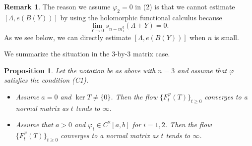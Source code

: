 \documentclass[12pt]{article}
\newtheorem{proposition}[theorem]{Proposition}
\theoremstyle{definition}
\newtheorem{remark}[theorem]{Remark}
\numberwithin{equation}{section}
\begin{document}
\begin{remark} The reason we assume $\varphi_2=0$ in (2) is that we cannot estimate $[\Lambda, e(B(Y))]$ 
by using the holomorphic functional calculus because 
\[\lim_{Y\to 0}s_{n-m^g_1}(\Lambda+Y)=0.\]
As we see below, we can directly estimate $[\Lambda, e(B(Y))]$ when $n$ is small. 
\end{remark}

We summarize the situation in the 3-by-3 matrix case. 

\begin{proposition} Let the notation be as above with $n=3$ and assume that $\varphi$ satisfies the condition (C1). 
\begin{itemize}
	\item [$(1)$] Assume $a=0$ and $\ker T\neq \{0\}$.   
	Then the flow $\{F^\varphi_t(T)\}_{t\geq 0}$ converges to a normal matrix as $t$ tends to $\infty$.  	
	\item [$(2)$] Assume that $a>0$ and $\varphi_i\in C^2[a,b]$ for $i=1,2$.  
	Then the flow $\{F^\varphi_t(T)\}_{t\geq 0}$ converges to a normal matrix as $t$ tends to $\infty$.  
\end{itemize}
\end{proposition}
\end{document}
